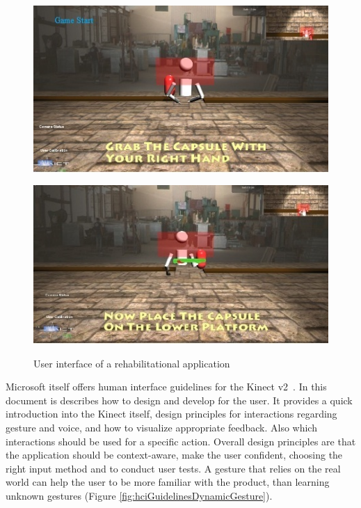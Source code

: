 \begin{figure}[htb]
	\centering
	\begin{minipage}[t]{0.49\linewidth}
		\centering
		\includegraphics[width=1\linewidth]{Pictures/gameInstruction}
		\label{fig:gameInstruction}
	\end{minipage}
	\hfill
	\begin{minipage}[t]{0.49\linewidth}
		\centering
		\includegraphics[width=1\linewidth]{Pictures/gameHighlighting}
		\label{fig:gameHighlighting}
	\end{minipage}
	\caption{User interface of a rehabilitational application~\cite{Chang2012-hz}}
	\label{fig:gameUIChang}
\end{figure}

Microsoft itself offers human interface guidelines for the Kinect v2~\cite{MicrosoftHIG2014-mh}. In this document is describes how to design and develop for the user. It provides a quick introduction into the Kinect itself, design principles for interactions regarding gesture and voice, and how to visualize appropriate feedback. Also which interactions should be used for a specific action. Overall design principles are that the application should be context-aware, make the user confident, choosing the right input method and to conduct user tests. A gesture that relies on the real world can help the user to be more familiar with the product, than learning unknown gestures (Figure \ref{fig:hciGuidelinesDynamicGesture}).

